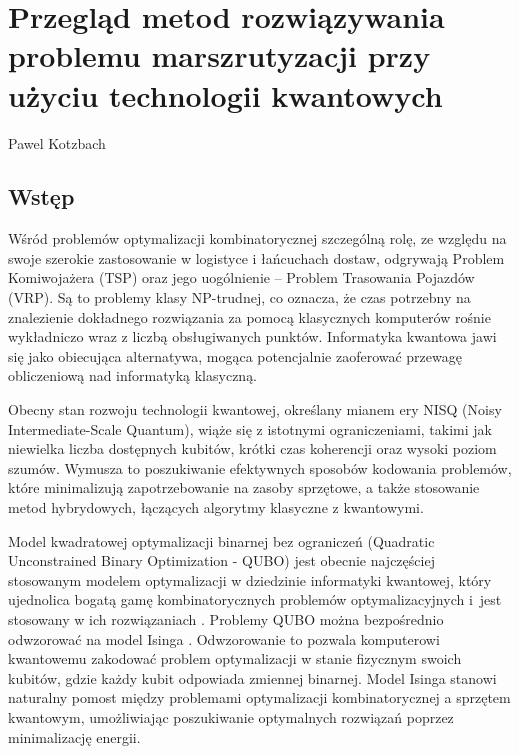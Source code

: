 \chapter[Przegląd metod kwantowych \ldots]{Przegląd metod rozwiązywania problemu marszrutyzacji przy użyciu technologii kwantowych}
\thispagestyle{empty}
\vspace{-8mm} {\large Pawel Kotzbach} \vspace{8mm}

\section{Wstęp}
Wśród problemów optymalizacji kombinatorycznej szczególną rolę, ze względu na swoje szerokie zastosowanie w logistyce i łańcuchach dostaw, odgrywają Problem Komiwojażera (TSP) oraz jego uogólnienie – Problem Trasowania Pojazdów (VRP). Są to problemy klasy NP-trudnej, co oznacza, że czas potrzebny na znalezienie dokładnego rozwiązania za pomocą klasycznych komputerów rośnie wykładniczo wraz z liczbą obsługiwanych punktów. Informatyka kwantowa jawi się jako obiecująca alternatywa, mogąca potencjalnie zaoferować przewagę obliczeniową nad informatyką klasyczną.

Obecny stan rozwoju technologii kwantowej, określany mianem ery NISQ (Noisy Intermediate-Scale Quantum), wiąże się z istotnymi ograniczeniami, takimi jak niewielka liczba dostępnych kubitów, krótki czas koherencji oraz wysoki poziom szumów. Wymusza to poszukiwanie efektywnych sposobów kodowania problemów, które minimalizują zapotrzebowanie na zasoby sprzętowe, a także stosowanie metod hybrydowych, łączących algorytmy klasyczne z kwantowymi.

Model kwadratowej optymalizacji binarnej bez ograniczeń (Quadratic Unconstrained Binary Optimization - QUBO) jest obecnie najczęściej stosowanym modelem optymalizacji w dziedzinie informatyki kwantowej, który ujednolica bogatą gamę kombinatorycznych problemów optymalizacyjnych i~jest stosowany w ich rozwiązaniach \cite{glover2019tutorialformulatingusingqubo}.
Problemy QUBO można bezpośrednio odwzorować na model Isinga \cite{Lucas_2014}. Odwzorowanie to pozwala komputerowi kwantowemu zakodować problem optymalizacji w stanie fizycznym swoich kubitów, gdzie każdy kubit odpowiada zmiennej binarnej. Model Isinga stanowi naturalny pomost między problemami optymalizacji kombinatorycznej a sprzętem kwantowym, umożliwiając poszukiwanie optymalnych rozwiązań poprzez minimalizację energii.

